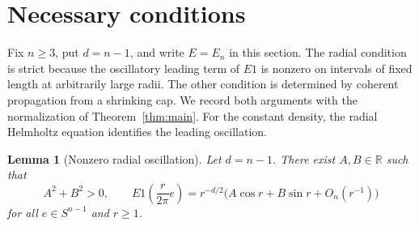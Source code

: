 \documentclass[11pt]{article}
\numberwithin{equation}{section}
\newtheorem{lemma}[theorem]{Lemma}
\newcommand{\R}{\mathbb{R}}
\begin{document}
\section{Necessary conditions}
\label{sec:necessity}

Fix \(n\ge3\), put \(d=n-1\), and write \(E=E_n\) in this section. The radial condition is strict because the oscillatory leading term of
\(E1\) is nonzero on intervals of fixed length at arbitrarily large radii.
The other condition is determined by coherent propagation from a shrinking
cap. We record both arguments with the normalization of Theorem~\ref{thm:main}.
For the constant density, the radial Helmholtz equation identifies
the leading oscillation.

\begin{lemma}[Nonzero radial oscillation]
\label{nec:constant-asymptotic}
Let \(d=n-1\). There exist \(A,B\in\R\) such that
\[
 A^2+B^2>0,\qquad
 E1\left(\frac{r}{2\pi}e\right)
 =r^{-d/2}\bigl(A\cos r+B\sin r+O_n(r^{-1})\bigr)
\]
for all \(e\in S^{n-1}\) and \(r\ge1\).
\end{lemma}
\end{document}
